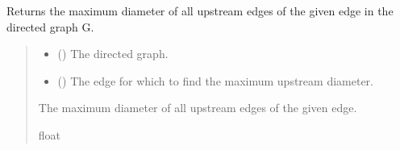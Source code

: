 \documentclass[letterpaper,10pt,english]{sphinxmanual}
\begin{document}
\begin{fulllineitems}
\label{\detokenize{pysewer:pysewer.optimization.get_max_upstream_diameter}}
\pysigstartsignatures
{}
\pysigstopsignatures
\sphinxAtStartPar
Returns the maximum diameter of all upstream edges of the given edge in the directed graph G.
\begin{quote}\begin{description}
\begin{itemize}
\item {} 
\sphinxAtStartPar
{} () \textendash{} The directed graph.

\item {} 
\sphinxAtStartPar
{} () \textendash{} The edge for which to find the maximum upstream diameter.

\end{itemize}

\sphinxAtStartPar
The maximum diameter of all upstream edges of the given edge.

\sphinxAtStartPar
float

\end{description}\end{quote}

\end{fulllineitems}

\end{document}
